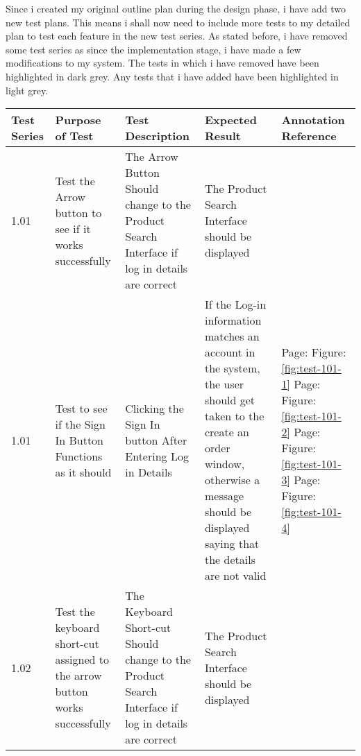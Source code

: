 Since i created my original outline plan during the design phase, i have add two new test plans. This means i shall now need to include more tests to my detailed plan to test each feature in the new test series. As stated before, i have removed some test series as since the implementation stage, i have made a few modifications to my system. The tests in which i have removed have been highlighted in dark grey. Any tests that i have added have been highlighted in light grey.

\begin{flushleft}
\begin{longtable}{|p{1cm}|p{2.5cm}|p{2.5cm}|p{2cm}|p{2cm}|}
        \hline
        \textbf{Test Series} & \textbf{Purpose of Test} & \textbf{Test Description} &  \textbf{Expected Result} & \textbf{Annotation Reference}\\ \hline
	\rowcolor{dark-grey}1.01 & Test the Arrow button to see if it works successfully & The Arrow Button Should change to the Product Search Interface if log in details are correct & The Product Search Interface should be displayed &  \\ \hline
	\rowcolor{light-grey}1.01 & Test to see if the Sign In Button Functions as it should & Clicking the Sign In  button After Entering Log in Details & If the Log-in information matches an account in the system, the user should get taken to the create an order window, otherwise a message should be displayed saying that the details are not valid & Page: \pageref{fig:test-101-1} \newline Figure: \ref{fig:test-101-1} \newline \newline Page: \pageref{fig:test-101-2} \newline Figure: \ref{fig:test-101-2} \newline \newline Page: \pageref{fig:test-101-3} \newline Figure: \ref{fig:test-101-3} \newline \newline Page: \pageref{fig:test-101-4} \newline Figure: \ref{fig:test-101-4} \\ \hline
	\rowcolor{dark-grey}1.02 & Test the keyboard short-cut assigned to the arrow button works successfully & The Keyboard Short-cut Should change to the Product Search Interface if log in details are correct &The Product Search Interface should be displayed &  \\ \hline

\end{longtable}
\end{flushleft}
